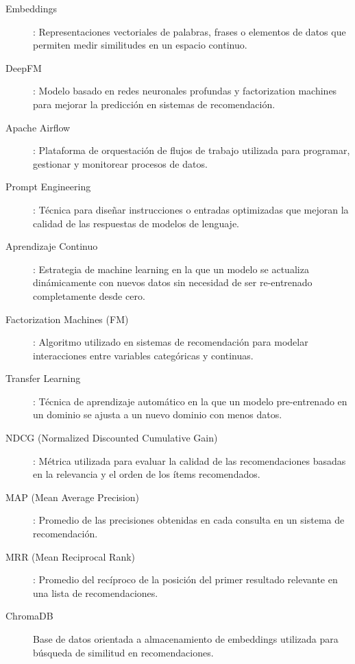 \documentclass[11pt,a4paper,twoside]{thesis}
\begin{document}
\begin{description}
	\item[Embeddings]: Representaciones vectoriales de palabras, frases o elementos de datos que permiten medir similitudes en un espacio continuo.
	\item[DeepFM]: Modelo basado en redes neuronales profundas y factorization machines para mejorar la predicción en sistemas de recomendación.
	\item[Apache Airflow]: Plataforma de orquestación de flujos de trabajo utilizada para programar, gestionar y monitorear procesos de datos.
	\item[Prompt Engineering]: Técnica para diseñar instrucciones o entradas optimizadas que mejoran la calidad de las respuestas de modelos de lenguaje.
	\item[Aprendizaje Continuo]: Estrategia de machine learning en la que un modelo se actualiza dinámicamente con nuevos datos sin necesidad de ser re-entrenado completamente desde cero.
	\item[Factorization Machines (FM)]: Algoritmo utilizado en sistemas de recomendación para modelar interacciones entre variables categóricas y continuas.
	\item[Transfer Learning]: Técnica de aprendizaje automático en la que un modelo pre-entrenado en un dominio se ajusta a un nuevo dominio con menos datos.
	\item[NDCG (Normalized Discounted Cumulative Gain)]: Métrica utilizada para evaluar la calidad de las recomendaciones basadas en la relevancia y el orden de los ítems recomendados.
	\item[MAP (Mean Average Precision)]: Promedio de las precisiones obtenidas en cada consulta en un sistema de recomendación.
	\item[MRR (Mean Reciprocal Rank)]: Promedio del recíproco de la posición del primer resultado relevante en una lista de recomendaciones.
	\item[ChromaDB] Base de datos orientada a almacenamiento de embeddings utilizada para búsqueda de similitud en recomendaciones.
\end{description}


\printbibliography[title=Referencias]
\end{document}
